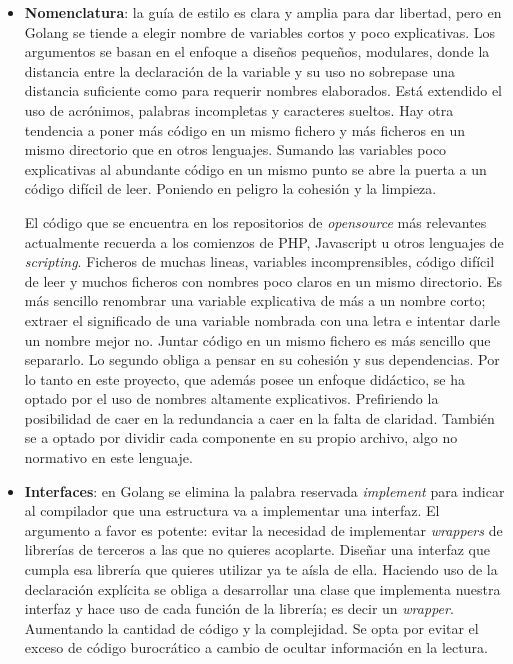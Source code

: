 \begin{itemize}
    \item \textbf{Nomenclatura}: la guía de estilo es clara y amplia para dar libertad, pero en Golang se tiende a elegir nombre de variables cortos y poco explicativas.
    Los argumentos se basan en el enfoque a diseños pequeños, modulares, donde la distancia entre la declaración de la variable y su uso no sobrepase una distancia suficiente como para requerir nombres elaborados.
    Está extendido el uso de acrónimos, palabras incompletas y caracteres sueltos.
    Hay otra tendencia a poner más código en un mismo fichero y más ficheros en un mismo directorio que en otros lenguajes.
    Sumando las variables poco explicativas al abundante código en un mismo punto se abre la puerta a un código difícil de leer.
    Poniendo en peligro la cohesión y la limpieza.

    El código que se encuentra en los repositorios de \textit{opensource} más relevantes actualmente recuerda a los comienzos de PHP, Javascript u otros lenguajes de \textit{scripting}.
    Ficheros de muchas lineas, variables incomprensibles, código difícil de leer y muchos ficheros con nombres poco claros en un mismo directorio.
    Es más sencillo renombrar una variable explicativa de más a un nombre corto;
    extraer el significado de una variable nombrada con una letra e intentar darle un nombre mejor no.
    Juntar código en un mismo fichero es más sencillo que separarlo.
    Lo segundo obliga a pensar en su cohesión y sus dependencias.
    Por lo tanto en este proyecto, que además posee un enfoque didáctico, se ha optado por el uso de nombres altamente explicativos.
    Prefiriendo la posibilidad de caer en la redundancia a caer en la falta de claridad.
    También se a optado por dividir cada componente en su propio archivo, algo no normativo en este lenguaje.

    \item \textbf{Interfaces}: en Golang se elimina la palabra reservada \textit{implement} para indicar al compilador que una estructura va a implementar una interfaz.
    El argumento a favor es potente: evitar la necesidad de implementar \textit{wrappers} de librerías de terceros a las que no quieres acoplarte.
    Diseñar una interfaz que cumpla esa librería que quieres utilizar ya te aísla de ella.
    Haciendo uso de la declaración explícita se obliga a desarrollar una clase que implementa nuestra interfaz y hace uso de cada función de la librería;
    es decir un \textit{wrapper}.
    Aumentando la cantidad de código y la complejidad.
    Se opta por evitar el exceso de código burocrático a cambio de ocultar información en la lectura.


\end{itemize}
